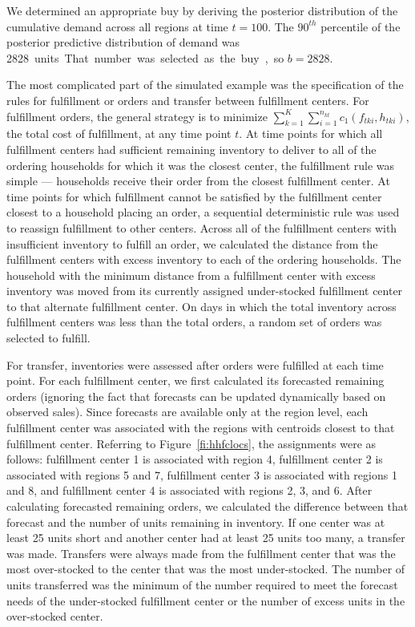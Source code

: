 \documentclass[11pt, oneside]{article}   	%
\begin{document}
We determined an appropriate buy by deriving the posterior distribution of the cumulative demand across all regions at time $t = 100$.  The $90^{th}$ percentile of the posterior predictive distribution of demand was \SI{2828} units.  That number was selected as the buy, so $b = 2828$.

The most complicated part of the simulated example was the specification of the rules for fulfillment or orders and transfer between fulfillment centers.  For fulfillment orders, the general strategy is to minimize $\sum_{k = 1}^K \sum_{i = 1}^{n_{kt}} c_1 (f_{tki}, h_{tki})$, the total cost of fulfillment, at any time point $t$.  At time points for which all fulfillment centers had sufficient remaining inventory to deliver to all of the ordering households for which it was the closest center, the fulfillment rule was simple --- households receive their order from the closest fulfillment center.  At time points for which fulfillment cannot be satisfied by the fulfillment center closest to a household placing an order, a sequential deterministic rule was used to reassign fulfillment to other centers.  Across all of the fulfillment centers with insufficient inventory to fulfill an order, we calculated the distance from the fulfillment centers with excess inventory to each of the ordering households.  The household with the minimum distance from a fulfillment center with excess inventory was moved from its currently assigned under-stocked fulfillment center to that alternate fulfillment center.  On days in which the total inventory across fulfillment centers was less than the total orders, a random set of orders was selected to fulfill.

For transfer, inventories were assessed after orders were fulfilled at each time point.  For each fulfillment center, we first calculated its forecasted remaining orders (ignoring the fact that forecasts can be updated dynamically based on observed sales).  Since forecasts are available only at the region level, each fulfillment center was associated with the regions with centroids closest to that fulfillment center.  Referring to Figure~\ref{fi:hhfclocs}, the assignments were as follows: fulfillment center 1 is associated with region 4, fulfillment center 2 is associated with regions 5 and 7, fulfillment center 3 is associated with regions 1 and 8, and fulfillment center 4 is associated with regions 2, 3, and 6.  After calculating forecasted remaining orders, we calculated the difference between that forecast and the number of units remaining in inventory.  If one center was at least 25 units short and another center had at least 25 units too many, a transfer was made.  Transfers were always made from the fulfillment center that was the most over-stocked to the center that was the most under-stocked.  The number of units transferred was the minimum of the number required to meet the forecast needs of the under-stocked fulfillment center or the number of excess units in the over-stocked center.
\end{document}
